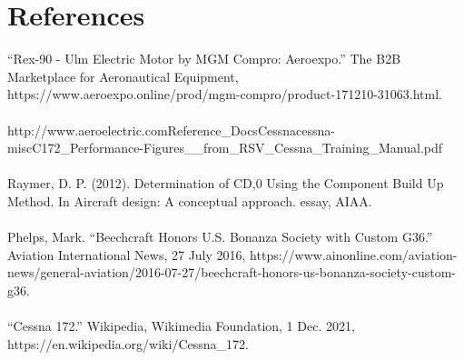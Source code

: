 \documentclass[12pt,A4paper]{article}
\begin{document}
	\section{References}
	\sloppy
	“Rex-90 - Ulm Electric Motor by MGM Compro: Aeroexpo.” The B2B Marketplace for Aeronautical Equipment, https://www.aeroexpo.online/prod/mgm-compro/product-171210-31063.html. \\ \\
	http://www.aeroelectric.com\/Reference\_Docs\/Cessna\/cessna-misc\/C172\_Performance-Figures\_\_from\_RSV\_Cessna\_Training\_Manual.pdf \\ \\
	Raymer, D. P. (2012). Determination of CD,0 Using the Component Build Up Method. In Aircraft design: A conceptual approach. essay, AIAA. \\ \\
	Phelps, Mark. “Beechcraft Honors U.S. Bonanza Society with Custom G36.” Aviation International News, 27 July 2016, https://www.ainonline.com/aviation-news/general-aviation/2016-07-27/beechcraft-honors-us-bonanza-society-custom-g36. \\ \\
	“Cessna 172.” Wikipedia, Wikimedia Foundation, 1 Dec. 2021, https://en.wikipedia.org/wiki/Cessna\_172. \\
	\clearpage
\end{document}
